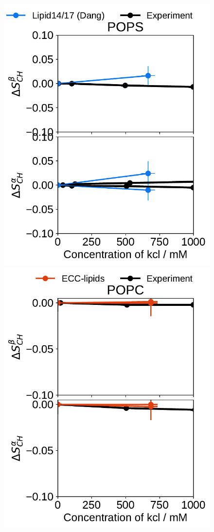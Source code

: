 \begin{figure}[htb!]
  \includegraphics[width=\figwidth]{../img/ecc_pops/l17/order_parameters_changes_A-B_POPS_kcl.pdf} 
  \includegraphics[width=\figwidth]{../img/ecc_pops/order_parameters_changes_A-B_POPC_kcl.pdf} 

\end{figure}

